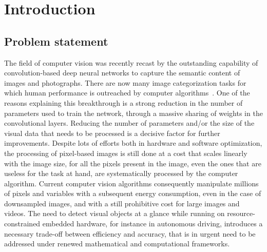\section{Introduction}
\label{sec:intro}
\subsection{Problem statement}
The field of computer vision was recently recast by the outstanding capability of convolution-based deep neural networks to capture the semantic content of images and photographs. There are now many image categorization tasks for which human performance is outreached by computer algorithms~\cite{He15}. One of the reasons explaining this breakthrough is a strong reduction in the number of parameters used to train the network, through a massive sharing of weights in the convolutional layers.
Reducing the number of parameters and/or the size of the visual data that needs to be processed is a decisive factor for further improvements. Despite lots of efforts both in hardware and software optimization, the processing of pixel-based images is still done at a cost that scales linearly with the image size, for all the pixels present in the image, even the ones that are useless for the task at hand, are systematically processed by the computer algorithm. %
Current computer vision algorithms consequently manipulate millions of pixels and variables with a subsequent energy consumption, even in the case of downsampled images, and with a still prohibitive cost for large images and videos. The need to detect visual objects at a glance while running on resource-constrained embedded hardware, for instance in autonomous driving, introduces a necessary trade-off between efficiency and accuracy, that is in urgent need to be addressed under renewed mathematical and computational frameworks.

